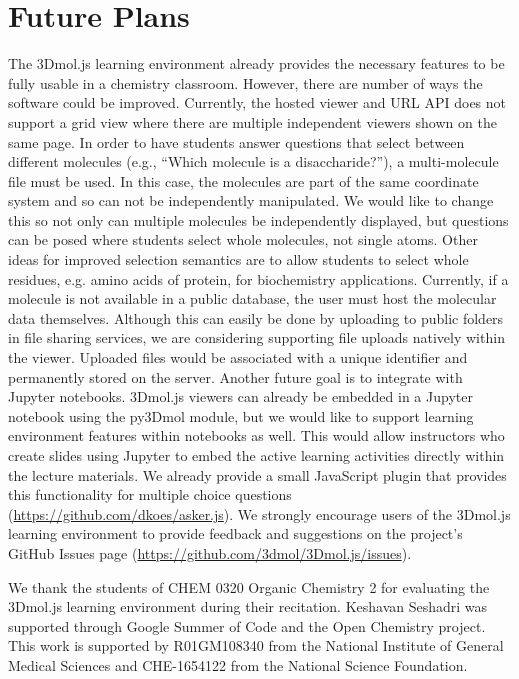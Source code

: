 \documentclass[journal=jceda8,manuscript=article]{achemso}
\begin{document}
\section{Future Plans}

The 3Dmol.js learning environment already provides the necessary features to be fully usable in a chemistry classroom.  However, there are number of ways the software could be improved.  Currently, the hosted viewer and URL API does not support a grid view where there are multiple independent viewers shown on the same page.  In order to have students answer questions that select between different molecules (e.g., ``Which molecule is a disaccharide?''), a multi-molecule file must be used. In this case, the molecules are part of the same coordinate system and so can not be independently manipulated.  We would like to change this so not only can multiple molecules be independently displayed, but questions can be posed where students select whole molecules, not single atoms.  Other ideas for improved selection semantics are to allow students to select whole residues, e.g. amino acids of protein, for biochemistry applications.  Currently, if a molecule is not available in a public database, the user must host the molecular data themselves.  Although this can easily be done by uploading to public folders in file sharing services, we are considering supporting file uploads natively within the viewer.  Uploaded files would be associated with a unique identifier and permanently stored on the server.  Another future goal is to integrate with Jupyter notebooks.  3Dmol.js viewers can already be embedded in a Jupyter notebook using the py3Dmol module, but we would like to support learning environment features within notebooks as well.  This would allow instructors who create slides using Jupyter to embed the active learning activities directly within the lecture materials. We already provide a small JavaScript plugin that provides this functionality for multiple choice questions (\url{https://github.com/dkoes/asker.js}).  
 We strongly encourage users of the 3Dmol.js learning environment to provide feedback and suggestions on the project's GitHub Issues page (\url{https://github.com/3dmol/3Dmol.js/issues}).
 


\begin{acknowledgement}


We thank the students of CHEM 0320 Organic Chemistry 2 for evaluating the 3Dmol.js learning environment during their recitation.
 Keshavan Seshadri was supported through Google Summer of Code and the Open Chemistry project.
  This work is supported by R01GM108340 from the National Institute of General Medical Sciences and CHE-1654122 from the National Science Foundation.

\end{acknowledgement}
\end{document}
